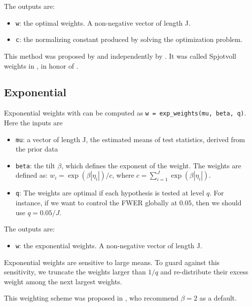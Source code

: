\documentclass[english,11pt]{article} %
\begin{document}
The outputs are: 
\begin{itemize}
\item \verb+w+:  the optimal weights. A non-negative vector of length J.
\item \verb+c+:  the normalizing constant produced by solving the optimization problem.
\end{itemize}

This method was proposed by \cite{wasserman2006weighted, roeder2009genome} and independently by \cite{rubin2006method}. It was called Spjotvoll weights in  \cite{dobriban2015optimal}, in honor of \citep{spjotvoll1972optimality}.

\subsection{Exponential}

Exponential weights with can be computed as \verb+w = exp_weights(mu, beta, q)+. Here the inputs are 

\begin{itemize}
\item \verb+mu+:  a vector of length J, the estimated means of test statistics, derived from the prior data
\item \verb+beta+:  the tilt $\beta$, which defines the exponent of the weight. The weights are defined as: $w_i = \exp(\beta|\eta_i|)/c$, where $c = \sum_{i=1}^{J}  \exp(\beta |\eta_i|)$.
\item \verb+q+: The weights are optimal if each hypothesis is tested at level $q$. For instance, if we want to control the FWER globally at $0.05$, then we should use $q = 0.05/J$.
\end{itemize}

The outputs are: 
\begin{itemize}
\item \verb+w+:  the exponential weights. A non-negative vector of length J.
\end{itemize}

Exponential weights are sensitive to large means. To guard against this sensitivity, we truncate the weights larger than $1/q$ and re-distribute their excess weight among the next largest weights. 

This weighting scheme was proposed in \citep{roeder2006using}, who recommend $\beta = 2$ as a default. 
\end{document}
